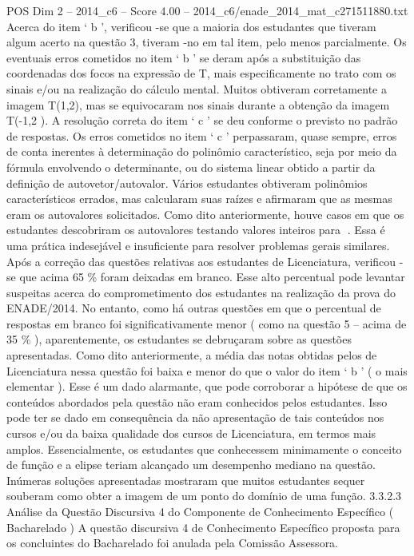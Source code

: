 \begin{textsample}{POS Dim 2 – 2014\_c6 – Score 4.00 – 2014\_c6/enade\_2014\_mat\_c271511880.txt}
Acerca do item ‘ b ’, verificou -se que a maioria dos estudantes que tiveram algum acerto na questão 3, tiveram -no em tal item, pelo menos parcialmente.
Os eventuais erros cometidos no item ‘ b ’ se deram após a substituição das coordenadas dos focos na expressão de T, mais especificamente no trato com os sinais e/ou na realização do cálculo mental.
Muitos obtiveram corretamente a imagem T(1,2), mas se equivocaram nos sinais durante a obtenção da imagem T(-1,2 ).
A resolução correta do item ‘ c ’ se deu conforme o previsto no padrão de respostas.
Os erros cometidos no item ‘ c ’ perpassaram, quase sempre, erros de conta inerentes à determinação do polinômio característico, seja por meio da fórmula envolvendo o determinante, ou do sistema linear obtido a partir da definição de autovetor/autovalor.
Vários estudantes obtiveram polinômios característicos errados, mas calcularam suas raízes e afirmaram que as mesmas eram os autovalores solicitados.
Como dito anteriormente, houve casos em que os estudantes descobriram os autovalores testando valores inteiros para .
Essa é uma prática indesejável e insuficiente para resolver problemas gerais similares.
Após a correção das questões relativas aos estudantes de Licenciatura, verificou -se que acima 65 \% foram deixadas em branco.
Esse alto percentual pode levantar suspeitas acerca do comprometimento dos estudantes na realização da prova do ENADE/2014.
No entanto, como há outras questões em que o percentual de respostas em branco foi significativamente menor ( como na questão 5 – acima de 35 \% ), aparentemente, os estudantes se debruçaram sobre as questões apresentadas.
Como dito anteriormente, a média das notas obtidas pelos de Licenciatura nessa questão foi baixa e menor do que o valor do item ‘ b ’ ( o mais elementar ).
Esse é um dado alarmante, que pode corroborar a hipótese de que os conteúdos abordados pela questão não eram conhecidos pelos estudantes.
Isso pode ter se dado em consequência da não apresentação de tais conteúdos nos cursos e/ou da baixa qualidade dos cursos de Licenciatura, em termos mais amplos.
Essencialmente, os estudantes que conhecessem minimamente o conceito de função e a elipse teriam alcançado um desempenho mediano na questão.
Inúmeras soluções apresentadas mostraram que muitos estudantes sequer souberam como obter a imagem de um ponto do domínio de uma função. 3.3.2.3 Análise da Questão Discursiva 4 do Componente de Conhecimento Específico ( Bacharelado ) A questão discursiva 4 de Conhecimento Específico proposta para os concluintes do Bacharelado foi anulada pela Comissão Assessora.

\end{textsample}
